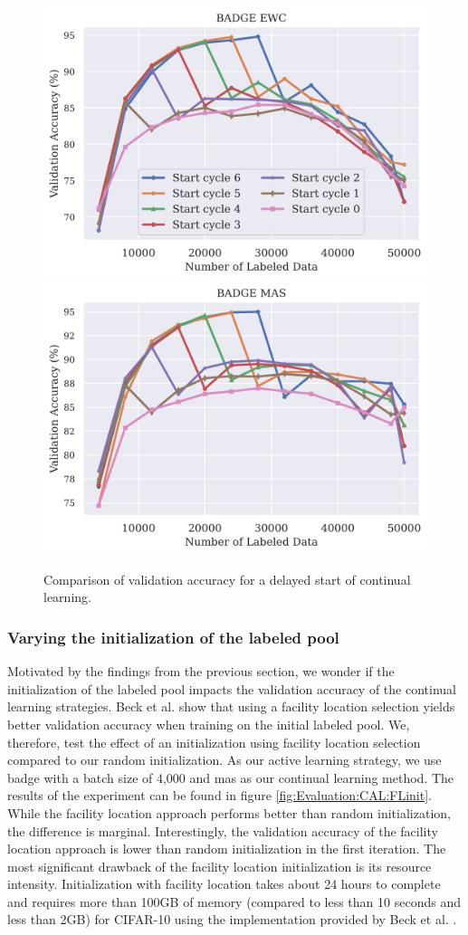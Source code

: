 \begin{figure}[h]
    \centering
    \includegraphics[width=0.45\linewidth]{images/results_CAL/delayed_start_badge_ewc.png} \hfill
    \includegraphics[width=0.45\linewidth]{images/results_CAL/delayed_start_badge_mas.png}
    \caption{Comparison of validation accuracy for a delayed start of continual learning.}
    \label{fig:Evaluation:CAL:DelayedStart}
\end{figure}

\subsubsection{Varying the initialization of the labeled pool}
\label{sec:Evaluation:CAL:Initialization}
Motivated by the findings from the previous section, we wonder if the initialization of the labeled pool impacts the validation accuracy of the continual learning strategies.
Beck et al. \cite{beck2021effective} show that using a facility location selection \cite{iyer2021submodular} yields better validation accuracy when training on the initial labeled pool.
We, therefore, test the effect of an initialization using facility location selection compared to our random initialization. As our active learning strategy, we use \gls{badge} with
a batch size of 4,000 and \gls{mas} as our continual learning method. The results of the experiment can be found in figure \ref{fig:Evaluation:CAL:FLinit}. While the facility
location approach performs better than random initialization, the difference is marginal. Interestingly, the validation accuracy of the facility location approach is lower than
random initialization in the first iteration. The most significant drawback of the facility location initialization is its resource intensity. Initialization with facility
location takes about 24 hours to complete and requires more than 100GB of memory (compared to less than 10 seconds and less than 2GB) for CIFAR-10 using the implementation provided by Beck et al.
\cite{beck2021effective}. \par


